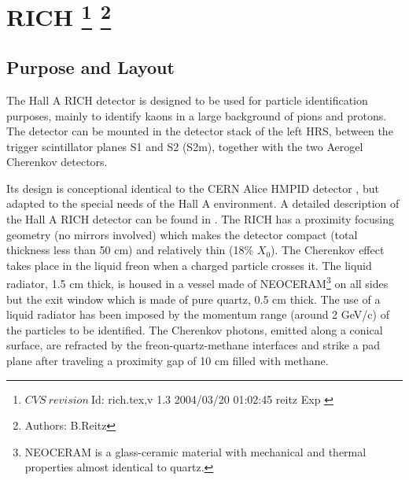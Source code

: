 \chapter[RICH]{RICH
\footnote{
  $CVS~revision~ $Id: rich.tex,v 1.3 2004/03/20 01:02:45 reitz Exp $ $
}
\footnote{Authors: B.Reitz }
}
\label{sec:rich}

\section{Purpose and Layout} 

The Hall A RICH detector is designed to be used for particle identification purposes, mainly 
to identify kaons in a large background of pions and protons. The detector can be mounted in
the detector stack of the left HRS, between the trigger scintillator planes S1 and S2 (S2m),
together with the two Aerogel Cherenkov detectors.

Its design is conceptional identical 
to the CERN Alice HMPID detector \cite{Beole:1998yq}, but adapted to the special needs
of the Hall A environment.
A detailed description of the Hall A RICH detector can be found in \cite{hallarep02}.
The RICH has a proximity focusing geometry (no mirrors involved) which makes the 
detector compact (total thickness less than 50 cm) and relatively thin (18\% $X_0$).
The Cherenkov effect takes place in the liquid freon 
when a charged particle 
crosses it.
The liquid radiator, 1.5 cm thick, 
is housed in a vessel made of NEOCERAM\footnote{NEOCERAM is
a glass-ceramic material with mechanical and thermal properties
almost identical to quartz.}    
on all sides but
the exit window which is made of pure quartz, 
0.5 cm thick. 
The use of a liquid radiator has been imposed by the momentum range (around
 2 GeV/c) of the particles to be identified.
The Cherenkov photons, emitted along a conical surface,
are refracted by the 
freon-quartz-methane interfaces and strike 
a pad plane after traveling a proximity gap 
of 10 cm filled with methane.



